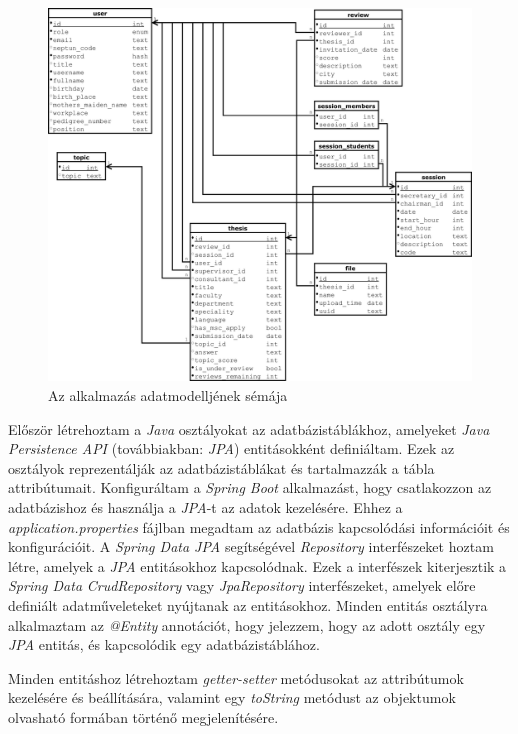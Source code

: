 \begin{figure}[ht]
	\includegraphics[width=\textwidth]{images/Adatmodell.pdf}
	\caption{Az alkalmazás adatmodelljének sémája}
	\label{fig:datamodel}
\end{figure}


Először létrehoztam a \textit{Java} \cite{java} osztályokat az adatbázistáblákhoz, amelyeket \textit{Java Persistence API} (továbbiakban: \textit{JPA}) \cite{Java Persistence API} entitásokként definiáltam. Ezek az osztályok reprezentálják az adatbázistáblákat és tartalmazzák a tábla attribútumait. Konfiguráltam a \textit{Spring Boot} \cite{spring_boot} alkalmazást, hogy csatlakozzon az adatbázishoz és használja a \textit{JPA}-t \cite{Java Persistence API} az adatok kezelésére. Ehhez a \textit{application.properties} fájlban megadtam az adatbázis kapcsolódási információit és konfigurációit. A \textit{Spring Data JPA} \cite{Spring Data JPA} segítségével \textit{Repository} interfészeket hoztam létre, amelyek a \textit{JPA} entitásokhoz kapcsolódnak. Ezek a interfészek kiterjesztik a \textit{Spring Data} \textit{CrudRepository} vagy \textit{JpaRepository} interfészeket, amelyek előre definiált adatműveleteket nyújtanak az entitásokhoz. Minden entitás osztályra alkalmaztam az \textit{@Entity} annotációt, hogy jelezzem, hogy az adott osztály egy \textit{JPA} entitás, és kapcsolódik egy adatbázistáblához.


Minden entitáshoz létrehoztam \textit{getter-setter} metódusokat az attribútumok kezelésére és beállítására, valamint egy \textit{toString} metódust az objektumok olvasható formában történő megjelenítésére.

